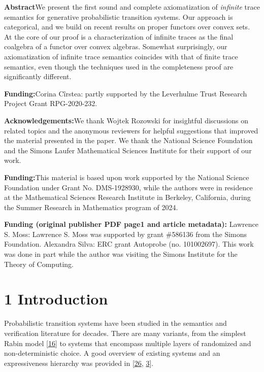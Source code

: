 %
\hypertarget{html:abstract}{} \par\noindent\textbf{Abstract}\quad  We present the first sound and complete axiomatization of \emph{infinite} trace semantics for generative probabilistic transition systems. Our approach is categorical, and we build on recent results on proper functors over convex sets. At the core of our proof is a characterization of infinite traces as the final coalgebra of a functor over convex algebras. Somewhat surprisingly, our axiomatization of infinite trace semantics coincides with that of finite trace semantics, even though the techniques used in the completeness proof are significantly different.
\par\medskip
 
 \par\noindent\textbf{Funding:}\quad Corina Cîrstea: partly supported by the Leverhulme Trust Research Project Grant RPG-2020-232. 
 \par\noindent\textbf{Acknowledgements:}\quad We thank Wojtek Rozowski for insightful discussions on related topics and the anonymous reviewers for helpful suggestions that improved the material presented in the paper. We thank the National Science Foundation and the Simons Laufer Mathematical Sciences Institute for their support of our work. 
 \par\noindent\textbf{Funding:}\quad This material is based upon work supported by the National Science Foundation under Grant No. DMS-1928930, while the authors were in residence at the Mathematical Sciences Research Institute in Berkeley, California, during the Summer Research in Mathematics program of 2024. 
%
\par\noindent\textbf{Funding (original publisher PDF page1 and article metadata):} Lawrence S. Moss: Lawrence S. Moss was supported by grant \#586136 from the Simons Foundation. Alexandra Silva: ERC grant Autoprobe (no. 101002697). This work was done in part while the author was visiting the Simons Institute for the Theory of Computing.\par\medskip
\hypertarget{html:S1}{} \section*{1 Introduction}
\hypertarget{html:S1.p1}{} Probabilistic transition systems have been studied in the semantics and verification literature for decades. There are many variants, from the simplest Rabin model [\hyperlink{html:bib.bib16}{16}] to systems that encompass multiple layers of randomized and non-deterministic choice. A good overview of existing systems and an expressiveness hierarchy was provided in [\hyperlink{html:bib.bib26}{26}, \hyperlink{html:bib.bib3}{3}].
